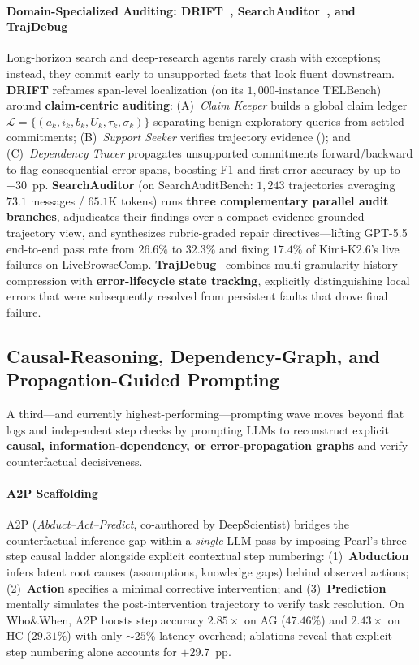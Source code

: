 \paragraph{Domain-Specialized Auditing: DRIFT~\citep{wang2026drift}, SearchAuditor~\citep{liang2026searchauditor}, and TrajDebug~\citep{qi2026trajdebug}\,\webtag}
Long-horizon search and deep-research agents rarely crash with exceptions; instead, they commit early to unsupported facts that look fluent downstream.
\textbf{DRIFT} reframes span-level localization (on its $1{,}000$-instance TELBench) around \textbf{claim-centric auditing}: (A)~\emph{Claim Keeper} builds a global claim ledger $\mathcal{L} = \{(a_k, i_k, b_k, U_k, \tau_k, \sigma_k)\}$ separating benign exploratory queries from settled commitments; (B)~\emph{Support Seeker} verifies trajectory evidence (); and (C)~\emph{Dependency Tracer} propagates unsupported commitments forward/backward to flag consequential error spans, boosting F1 and first-error accuracy by up to $+30$~pp.
\textbf{SearchAuditor} (on SearchAuditBench: $1{,}243$ trajectories averaging $73.1$ messages / $65.1\text{K}$ tokens) runs \textbf{three complementary parallel audit branches}, adjudicates their findings over a compact evidence-grounded trajectory view, and synthesizes rubric-graded repair directives---lifting GPT-5.5 end-to-end pass rate from $26.6\%$ to $32.3\%$ and fixing $17.4\%$ of Kimi-K2.6's live failures on LiveBrowseComp.
\textbf{TrajDebug}~\citep{qi2026trajdebug} combines multi-granularity history compression with \textbf{error-lifecycle state tracking}, explicitly distinguishing local errors that were subsequently resolved from persistent faults that drove final failure.

\subsection{Causal-Reasoning, Dependency-Graph, and Propagation-Guided Prompting}
A third---and currently highest-performing---prompting wave moves beyond flat logs and independent step checks by prompting LLMs to reconstruct explicit \textbf{causal, information-dependency, or error-propagation graphs} and verify counterfactual decisiveness.

\paragraph{A2P Scaffolding~\citep{weng2025a2p}}
A2P (\emph{Abduct--Act--Predict}, co-authored by DeepScientist) bridges the counterfactual inference gap within a \emph{single} LLM pass by imposing Pearl's three-step causal ladder alongside explicit contextual step numbering: (1)~\textbf{Abduction} infers latent root causes (assumptions, knowledge gaps) behind observed actions; (2)~\textbf{Action} specifies a minimal corrective intervention; and (3)~\textbf{Prediction} mentally simulates the post-intervention trajectory to verify task resolution. On Who\&When, A2P boosts step accuracy $2.85\times$ on AG ($47.46\%$) and $2.43\times$ on HC ($29.31\%$) with only $\sim 25\%$ latency overhead; ablations reveal that explicit step numbering alone accounts for $+29.7$~pp.

